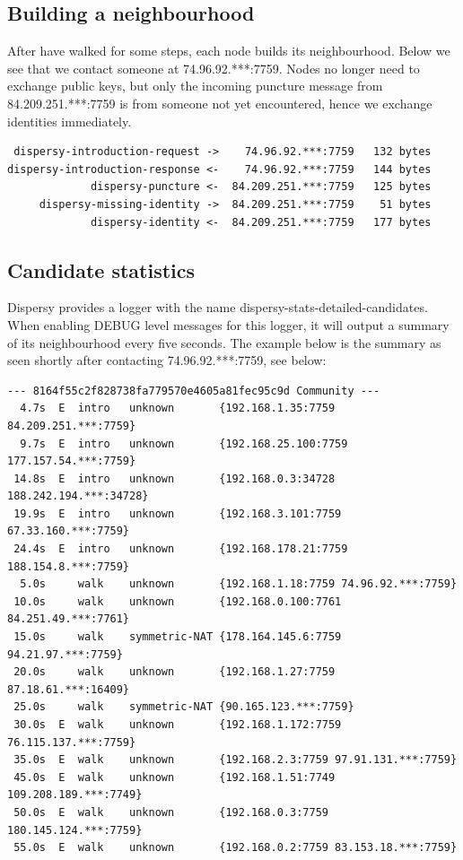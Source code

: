 \subsection{Building a neighbourhood}
\label{sec-9-2}
After have walked for some steps, each node builds its neighbourhood.
Below we see that we contact someone at 74.96.92.***:7759.  Nodes no
longer need to exchange public keys, but only the incoming puncture
message from 84.209.251.***:7759 is from someone not yet encountered,
hence we exchange identities immediately.

\begin{verbatim}
 dispersy-introduction-request ->    74.96.92.***:7759   132 bytes
dispersy-introduction-response <-    74.96.92.***:7759   144 bytes
             dispersy-puncture <-  84.209.251.***:7759   125 bytes
     dispersy-missing-identity ->  84.209.251.***:7759    51 bytes
             dispersy-identity <-  84.209.251.***:7759   177 bytes
\end{verbatim}
\subsection{Candidate statistics}
\label{sec-9-3}
Dispersy provides a logger with the name
dispersy-stats-detailed-candidates.  When enabling DEBUG level
messages for this logger, it will output a summary of its
neighbourhood every five seconds.  The example below is the summary as
seen shortly after contacting 74.96.92.***:7759, see below:

\begin{verbatim}
--- 8164f55c2f828738fa779570e4605a81fec95c9d Community ---
  4.7s  E  intro   unknown       {192.168.1.35:7759 84.209.251.***:7759}
  9.7s  E  intro   unknown       {192.168.25.100:7759 177.157.54.***:7759}
 14.8s  E  intro   unknown       {192.168.0.3:34728 188.242.194.***:34728}
 19.9s  E  intro   unknown       {192.168.3.101:7759 67.33.160.***:7759}
 24.4s  E  intro   unknown       {192.168.178.21:7759 188.154.8.***:7759}
  5.0s     walk    unknown       {192.168.1.18:7759 74.96.92.***:7759}
 10.0s     walk    unknown       {192.168.0.100:7761 84.251.49.***:7761}
 15.0s     walk    symmetric-NAT {178.164.145.6:7759 94.21.97.***:7759}
 20.0s     walk    unknown       {192.168.1.27:7759 87.18.61.***:16409}
 25.0s     walk    symmetric-NAT {90.165.123.***:7759}
 30.0s  E  walk    unknown       {192.168.1.172:7759 76.115.137.***:7759}
 35.0s  E  walk    unknown       {192.168.2.3:7759 97.91.131.***:7759}
 45.0s  E  walk    unknown       {192.168.1.51:7749 109.208.189.***:7749}
 50.0s  E  walk    unknown       {192.168.0.3:7759 180.145.124.***:7759}
 55.0s  E  walk    unknown       {192.168.0.2:7759 83.153.18.***:7759}
\end{verbatim}

